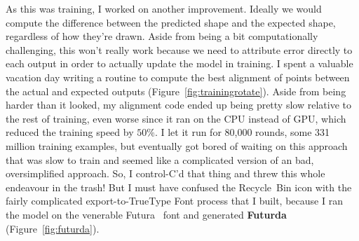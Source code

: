 \documentclass[twocolumn]{article}
\begin{document}
As this was training, I worked on another improvement. Ideally we
would compute the difference between the predicted shape and the
expected shape, regardless of how they're drawn. Aside from being a
bit computationally challenging, this won't really work because we
need to attribute error directly to each output in order to actually
update the model in training. I spent a valuable vacation day writing
a routine to compute the best alignment of points between the actual
and expected outputs (Figure~\ref{fig:trainingrotate}). Aside from being
harder than it looked, my alignment code ended up being pretty slow
relative to the rest of training, even worse since it ran on the CPU
instead of GPU, which reduced the training speed by $50\%$. I let it
run for 80,000 rounds, some 331 million training examples, but
eventually got bored of waiting on this approach that was slow to
train and seemed like a complicated version of an bad, oversimplified
approach. So, I control-C'd that thing and threw this whole endeavour
in the trash! But I must have confused the Recycle~Bin icon with the
fairly complicated export-to-TrueType Font process that I built,
because I ran the model on the venerable Futura~\cite{futura} font and
generated {\bf Futurda} (Figure~\ref{fig:futurda}).
%
%
\end{document}
